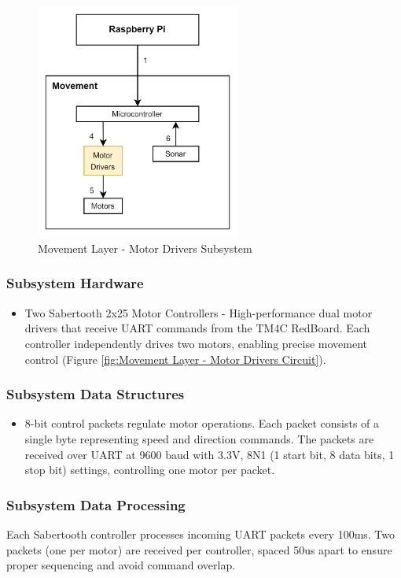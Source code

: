 \begin{figure}[h!]
	\centering
 	\includegraphics[width=0.60\textwidth]{images/movement/2_motordriver.jpg}
 \caption{Movement Layer - Motor Drivers Subsystem}
\end{figure}

\subsubsection{Subsystem Hardware}
\begin{itemize}
    \item Two Sabertooth 2x25 Motor Controllers - High-performance dual motor drivers that receive UART commands from the TM4C RedBoard. Each controller independently drives two motors, enabling precise movement control (Figure \ref{fig:Movement Layer - Motor Drivers Circuit}).
\end{itemize}

\subsubsection{Subsystem Data Structures}
\begin{itemize}
    \item 8-bit control packets regulate motor operations. Each packet consists of a single byte representing speed and direction commands. The packets are received over UART at 9600 baud with 3.3V, 8N1 (1 start bit, 8 data bits, 1 stop bit) settings, controlling one motor per packet.
\end{itemize}

\subsubsection{Subsystem Data Processing}
Each Sabertooth controller processes incoming UART packets every 100ms. Two packets (one per motor) are received per controller, spaced 50us apart to ensure proper sequencing and avoid command overlap.
\newpage



